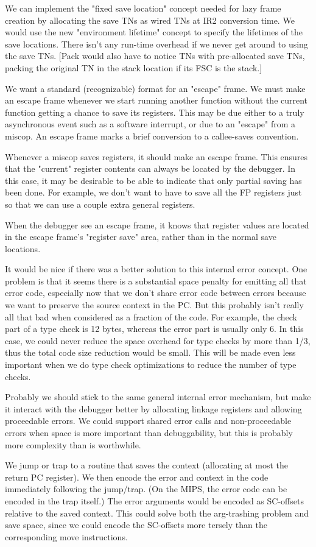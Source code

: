 We can implement the "fixed save location" concept needed for lazy frame
creation by allocating the save TNs as wired TNs at IR2 conversion time.  We
would use the new "environment lifetime" concept to specify the lifetimes of
the save locations.  There isn't any run-time overhead if we never get around
to using the save TNs.  [Pack would also have to notice TNs with pre-allocated
save TNs, packing the original TN in the stack location if its FSC is the
stack.]


We want a standard (recognizable) format for an "escape" frame.  We must make
an escape frame whenever we start running another function without the current
function getting a chance to save its registers.  This may be due either to a
truly asynchronous event such as a software interrupt, or due to an "escape"
from a miscop.  An escape frame marks a brief conversion to a callee-saves
convention.

Whenever a miscop saves registers, it should make an escape frame.  This
ensures that the "current" register contents can always be located by the
debugger.  In this case, it may be desirable to be able to indicate that only
partial saving has been done.  For example, we don't want to have to save all
the FP registers just so that we can use a couple extra general registers.

When the debugger see an escape frame, it knows that register values are
located in the escape frame's "register save" area, rather than in the normal
save locations.

It would be nice if there was a better solution to this internal error concept.
One problem is that it seems there is a substantial space penalty for emitting
all that error code, especially now that we don't share error code between
errors because we want to preserve the source context in the PC.  But this
probably isn't really all that bad when considered as a fraction of the code.
For example, the check part of a type check is 12 bytes, whereas the error part
is usually only 6.  In this case, we could never reduce the space overhead for
type checks by more than 1/3, thus the total code size reduction would be
small.  This will be made even less important when we do type check
optimizations to reduce the number of type checks.

Probably we should stick to the same general internal error mechanism, but make
it interact with the debugger better by allocating linkage registers and
allowing proceedable errors.  We could support shared error calls and
non-proceedable errors when space is more important than debuggability, but
this is probably more complexity than is worthwhile.

We jump or trap to a routine that saves the context (allocating at most the
return PC register).  We then encode the error and context in the code
immediately following the jump/trap.  (On the MIPS, the error code can be
encoded in the trap itself.)  The error arguments would be encoded as
SC-offsets relative to the saved context.  This could solve both the
arg-trashing problem and save space, since we could encode the SC-offsets more
tersely than the corresponding move instructions.
